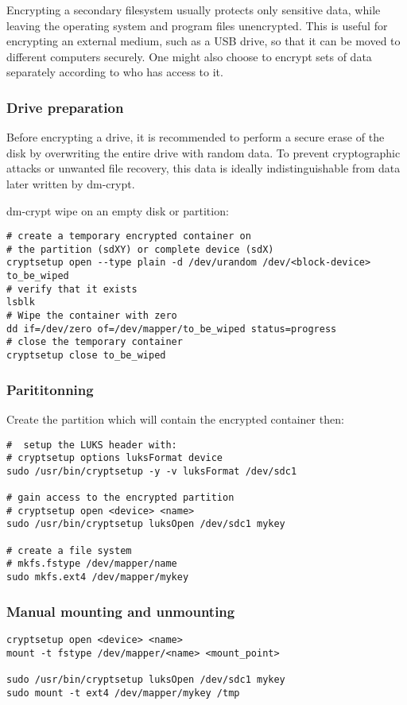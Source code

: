 Encrypting a secondary filesystem usually protects only sensitive data, while
leaving the operating system and program files unencrypted. This is useful for
encrypting an external medium, such as a USB drive, so that it can be moved to
different computers securely. One might also choose to encrypt sets of data
separately according to who has access to it.

\subsubsection{Drive preparation}

Before encrypting a drive, it is recommended to perform a secure erase of the
disk by overwriting the entire drive with random data. To prevent cryptographic
attacks or unwanted file recovery, this data is ideally indistinguishable from
data later written by dm-crypt.

dm-crypt wipe on an empty disk or partition:
\begin{verbatim}
# create a temporary encrypted container on 
# the partition (sdXY) or complete device (sdX)
cryptsetup open --type plain -d /dev/urandom /dev/<block-device> to_be_wiped
# verify that it exists
lsblk
# Wipe the container with zero
dd if=/dev/zero of=/dev/mapper/to_be_wiped status=progress
# close the temporary container
cryptsetup close to_be_wiped
\end{verbatim}

\subsubsection{Parititonning}

Create the partition which will contain the encrypted container then:
\begin{verbatim}
#  setup the LUKS header with: 
# cryptsetup options luksFormat device
sudo /usr/bin/cryptsetup -y -v luksFormat /dev/sdc1

# gain access to the encrypted partition
# cryptsetup open <device> <name>
sudo /usr/bin/cryptsetup luksOpen /dev/sdc1 mykey

# create a file system 
# mkfs.fstype /dev/mapper/name
sudo mkfs.ext4 /dev/mapper/mykey
\end{verbatim}

\subsubsection{Manual mounting and unmounting}
\begin{verbatim}
cryptsetup open <device> <name>
mount -t fstype /dev/mapper/<name> <mount_point>

sudo /usr/bin/cryptsetup luksOpen /dev/sdc1 mykey
sudo mount -t ext4 /dev/mapper/mykey /tmp
\end{verbatim}

